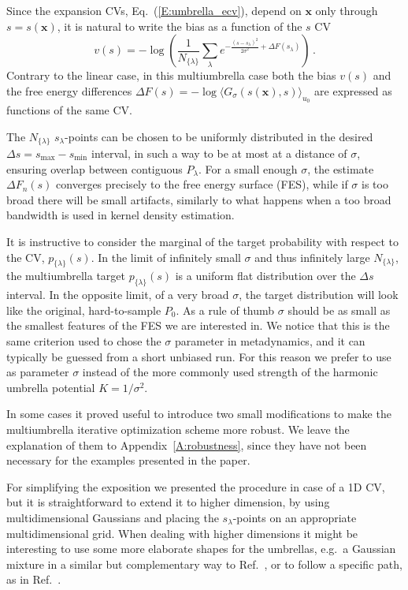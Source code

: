 \documentclass[aps,prx,reprint,superscriptaddress]{revtex4-1} %
\begin{document}
Since the expansion CVs, Eq.~(\ref{E:umbrella_ecv}), depend on $\mathbf{x}$ only through $s=s(\mathbf{x})$, it is natural to write the bias as a function of the $s$ CV
\begin{equation}
    v(s)=-\log \left( \frac{1}{N_{\{\lambda\}}}\sum_\lambda e^{-\frac{(s-s_\lambda)^2}{2\sigma^2}+ \Delta F(s_\lambda)} \right)\, .
\end{equation}
Contrary to the linear case, in this multiumbrella case both the bias $v(s)$ and the free energy differences ${\Delta F(s)=-\log \langle G_\sigma(s(\mathbf{x}),s)\rangle_{u_0}}$ are expressed as functions of the same CV.

The $N_{\{\lambda\}}$ $s_\lambda$-points can be chosen to be uniformly distributed in the desired $\Delta s=s_{\max}-s_{\min}$ interval, in such a way to be at most at a distance of $\sigma$, ensuring overlap between contiguous $P_\lambda$.
For a small enough $\sigma$, the estimate $\Delta F_n(s)$ converges precisely to the free energy surface (FES), while if $\sigma$ is too broad there will be small artifacts, similarly to what happens when a too broad bandwidth is used in kernel density estimation.

It is instructive to consider the marginal of the target probability with respect to the CV, $p_{\{\lambda\}}(s)$.
In the limit of infinitely small $\sigma$ and thus infinitely large $N_{\{\lambda\}}$, the multiumbrella target $p_{\{\lambda\}}(s)$ is a uniform flat distribution over the $\Delta s$ interval.
In the opposite limit, of a very broad $\sigma$, the target distribution will look like the original, hard-to-sample $P_0$.
As a rule of thumb $\sigma$ should be as small as the smallest features of the FES we are interested in.
We notice that this is the same criterion used to chose the $\sigma$ parameter in metadynamics\cite{Valsson2016}, and it can typically be guessed from a short unbiased run.
For this reason we prefer to use as parameter $\sigma$ instead of the more commonly used strength of the harmonic umbrella potential $K=1/\sigma^2$\cite{Kastner2011}.

In some cases it proved useful to introduce two small modifications to make the multiumbrella iterative optimization scheme more robust.
We leave the explanation of them to Appendix~\ref{A:robustness}, since they have not been necessary for the examples presented in the paper.

For simplifying the exposition we presented the procedure in case of a 1D CV, but it is straightforward to extend it to higher dimension, by using multidimensional Gaussians and placing the $s_\lambda$-points on an appropriate multidimensional grid.
When dealing with higher dimensions it might be interesting to use some more elaborate shapes for the umbrellas, e.g.~a Gaussian mixture in a similar but complementary way to Ref.~, or to follow a specific path, as in Ref.~.
\end{document}
